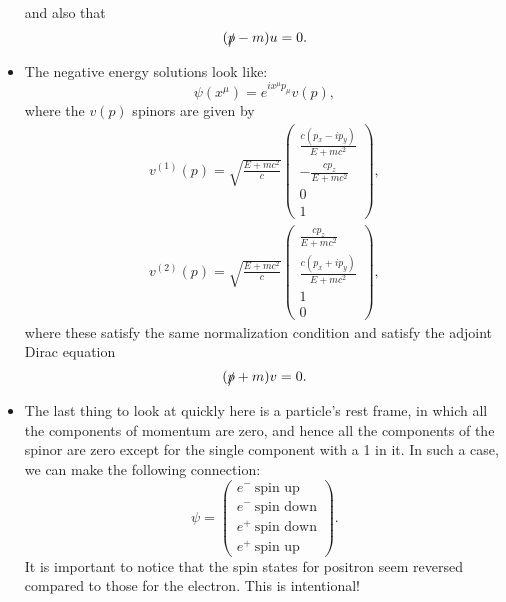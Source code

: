 \begin{itemize}
        and also that
        \begin{equation}
            (\slashed{p} - m)u = 0.
        \end{equation}
    \item The negative energy solutions look like:
        \begin{equation}
            \psi(x^{\mu}) = e^{ix^{\mu}p_{\mu}}v(p),
        \end{equation}
        where the $v(p)$ spinors are given by
        \begin{gather}
            v^{(1)}(p) = \sqrt{\frac{E+mc^2}{c}} \begin{pmatrix} \frac{c(p_x - ip_y)}{E+mc^2} \\[5pt] -\frac{cp_z}{E+mc^2} \\[5pt] 0 \\ 1 
            \end{pmatrix}, \\
            v^{(2)}(p) = \sqrt{\frac{E+mc^2}{c}} \begin{pmatrix} \frac{c p_z}{E+mc^2} \\[5pt] \frac{c(p_x + ip_y)}{E+mc^2} \\[5pt] 1 \\ 0 
            \end{pmatrix},
        \end{gather}
        where these satisfy the same normalization condition and satisfy the adjoint Dirac equation
        \begin{equation}
            (\slashed{p} + m)v = 0.
        \end{equation}
    \item The last thing to look at quickly here is a particle's rest frame, in which all the components of momentum are zero, and hence all the components of the spinor are zero except for the single component with a 1 in it. In such a case, we can make the following connection:
        \begin{equation*}
            \psi = 
                \begin{pmatrix}
                    e^-\ \text{spin up} \\
                    e^-\ \text{spin down} \\
                    e^+\ \text{spin down} \\
                    e^+\ \text{spin up}
                \end{pmatrix}.
        \end{equation*}
        It is important to notice that the spin states for positron seem reversed compared to those for the electron. This is intentional!
\end{itemize}


